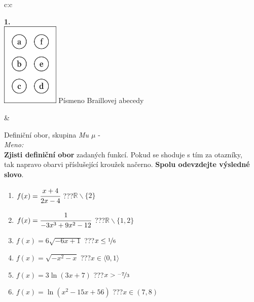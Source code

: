 \documentclass[10pt]{report}
\begin{document}
\begin{tabular}{c:c}
\begin{minipage}[c][99mm][t]{0.49\linewidth}
\begin{center}
\begin{minipage}{0.20\linewidth}
\begin{center}
{\Huge\bfseries 1.} \\[2mm]
\includegraphics[height=40mm]{../images/braille.png}
{\small Písmeno Braillovej abecedy}
\end{center}
\end{minipage}
\end{center}
\end{minipage}
&
\begin{minipage}[c][99mm][t]{0.49\linewidth}
\begin{center}
\vspace{7mm}
{\huge Definiční obor, skupina \textit{Mu $\mu$} -}\\[4.5mm]
\textit{Meno:}\phantom{xxxxxxxxxxxxxxxxxxxxxxxxxxxxxxxxxxxxxxxxxxxxxxxxxxxxxxxxxxxxxxxxx}\\[3.5mm]
\textbf{Zjisti definiční obor} zadaných funkcí. Pokud se shoduje s tím za otazníky,\\tak napravo obarvi příslušející kroužek načerno. \textbf{Spolu odevzdejte výsledné slovo}.\\[3mm]
\begin{minipage}{0.77\linewidth}
\begin{center}
\begin{varwidth}{\textwidth}
\begin{enumerate}
\normalsize
\item $f(x)=\cfrac{x+4}{2x-4}$\quad \dotfill\; ???\;\dotfill \quad $\mathbb{R}\smallsetminus\{2\}$
\item $f(x)=\cfrac{1}{-3x^3+9x^2-12}$\quad \dotfill\; ???\;\dotfill \quad $\mathbb{R}\smallsetminus\{1,2\}$
\item $f(x)=6\sqrt{-6x+1}$\quad \dotfill\; ???\;\dotfill \quad $x\leq\nicefrac{1}{6}$
\item $f(x)=\sqrt{-x^2-x}$\quad \dotfill\; ???\;\dotfill \quad $x\in\langle0 , 1\rangle$
\item $f(x)=3\ln{(3x+7)}$\quad \dotfill\; ???\;\dotfill \quad $x>\nicefrac{-7}{3}$
\item $f(x)=\ln{(x^2-15x+56)}$\quad \dotfill\; ???\;\dotfill \quad $x\in(7 , 8)$

\end{enumerate}
\end{varwidth}
\end{center}
\end{minipage}
\end{center}
\end{minipage}
\end{tabular}
\end{document}
